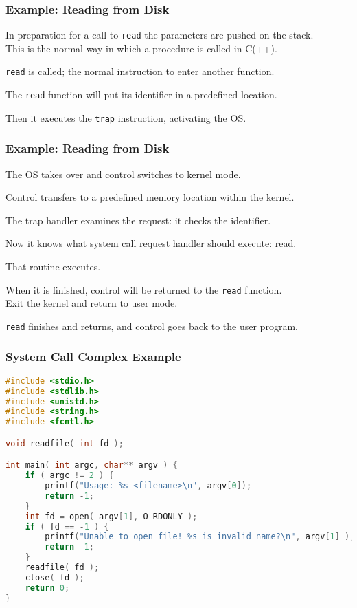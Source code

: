 \begin{frame}
	\frametitle{Example: Reading from Disk}

	In preparation for a call to \texttt{read} the parameters are pushed on the stack.\\
	\quad This is the normal way in which a procedure is called in C(++).

	\texttt{read} is called; the normal instruction to enter another function.

	The \texttt{read} function will put its identifier in a predefined location.

	Then it executes the \texttt{trap} instruction, activating the OS.

\end{frame}

\begin{frame}
	\frametitle{Example: Reading from Disk}


	The OS takes over and control switches to kernel mode.

	Control transfers to a predefined memory location within the kernel.

	The trap handler examines the request: it checks the identifier.

	Now it knows what system call request handler should execute: read.

	That routine executes.

	When it is finished, control will be returned to the \texttt{read} function.\\
	\quad Exit the kernel and return to user mode.

	\texttt{read} finishes and returns, and control goes back to the user program.


\end{frame}


\begin{frame}[fragile]
	\frametitle{System Call Complex Example}

	\begin{lstlisting}[language=C]
#include <stdio.h>
#include <stdlib.h>
#include <unistd.h>
#include <string.h>
#include <fcntl.h>

void readfile( int fd );

int main( int argc, char** argv ) {
    if ( argc != 2 ) {
        printf("Usage: %s <filename>\n", argv[0]);
        return -1;
    }
    int fd = open( argv[1], O_RDONLY );
    if ( fd == -1 ) {
        printf("Unable to open file! %s is invalid name?\n", argv[1] );
        return -1;
    }
    readfile( fd );
    close( fd );
    return 0;
}
\end{lstlisting}
\end{frame}

